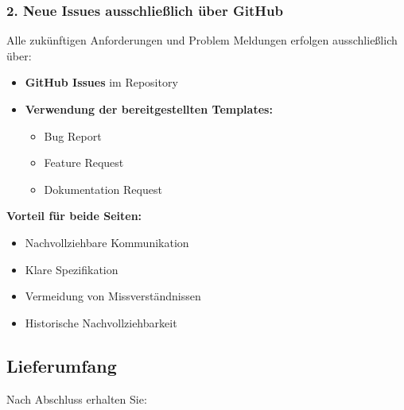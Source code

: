 \documentclass[a4paper,11pt]{article}
\providecommand{\tightlist}{\setlength{\itemsep}{0pt}\setlength{\parskip}{0pt}}
\begin{document}
\hypertarget{neue-issues-ausschlieuxdflich-uxfcber-github}{%
\subsubsection{2. Neue Issues ausschließlich über
GitHub}\label{neue-issues-ausschlieuxdflich-uxfcber-github}}

Alle zukünftigen Anforderungen und Problem Meldungen erfolgen
ausschließlich über:

\begin{itemize}
\tightlist
\item
  \textbf{GitHub Issues} im Repository
\item
  \textbf{Verwendung der bereitgestellten Templates:}

  \begin{itemize}
  \tightlist
  \item
    Bug Report
  \item
    Feature Request
  \item
    Dokumentation Request
  \end{itemize}
\end{itemize}

\textbf{Vorteil für beide Seiten:}

\begin{itemize}
\tightlist
\item
  Nachvollziehbare Kommunikation
\item
  Klare Spezifikation
\item
  Vermeidung von Missverständnissen
\item
  Historische Nachvollziehbarkeit
\end{itemize}

\hypertarget{lieferumfang}{%
\subsection{Lieferumfang}\label{lieferumfang}}

Nach Abschluss erhalten Sie:
\end{document}
